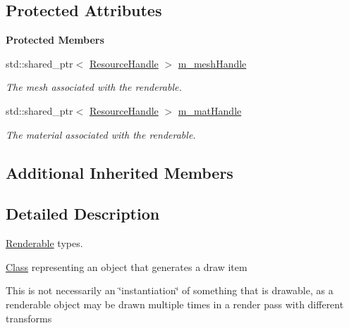 \subsection*{Protected Attributes}
\begin{Indent}\textbf{ Protected Members}\par
\begin{DoxyCompactItemize}
\item 
\mbox{\label{classrev_1_1_renderable_a52a681f065c8a22ef1f7450bad6d3af2}} 
std\+::shared\+\_\+ptr$<$ \mbox{\hyperlink{classrev_1_1_resource_handle}{Resource\+Handle}} $>$ \mbox{\hyperlink{classrev_1_1_renderable_a52a681f065c8a22ef1f7450bad6d3af2}{m\+\_\+mesh\+Handle}}
\begin{DoxyCompactList}\small\item\em The mesh associated with the renderable. \end{DoxyCompactList}\item 
\mbox{\label{classrev_1_1_renderable_ab949c66b11dff316935cc37dbc30fc31}} 
std\+::shared\+\_\+ptr$<$ \mbox{\hyperlink{classrev_1_1_resource_handle}{Resource\+Handle}} $>$ \mbox{\hyperlink{classrev_1_1_renderable_ab949c66b11dff316935cc37dbc30fc31}{m\+\_\+mat\+Handle}}
\begin{DoxyCompactList}\small\item\em The material associated with the renderable. \end{DoxyCompactList}\end{DoxyCompactItemize}
\end{Indent}
\subsection*{Additional Inherited Members}


\subsection{Detailed Description}
\mbox{\hyperlink{classrev_1_1_renderable}{Renderable}} types. 

\mbox{\hyperlink{struct_class}{Class}} representing an object that generates a draw item

This is not necessarily an \char`\"{}instantiation\char`\"{} of something that is drawable, as a renderable object may be drawn multiple times in a render pass with different transforms 

